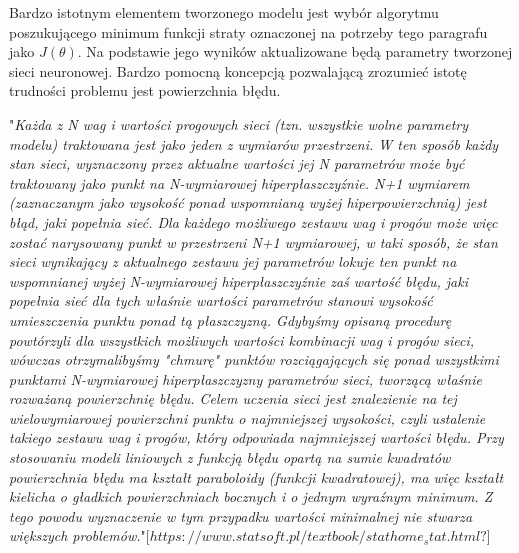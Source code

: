 \documentclass[]{article}
\theoremstyle{definition}
\begin{document}

Bardzo istotnym elementem tworzonego modelu jest wybór algorytmu poszukującego minimum funkcji straty oznaczonej na potrzeby tego paragrafu jako $J(\theta)$. Na podstawie jego wyników aktualizowane będą parametry tworzonej sieci neuronowej. Bardzo pomocną koncepcją pozwalającą zrozumieć istotę trudności problemu jest powierzchnia błędu.

"\textit{Każda z N wag i wartości progowych sieci (tzn. wszystkie wolne parametry modelu) traktowana jest jako jeden z wymiarów przestrzeni. W ten sposób każdy stan sieci, wyznaczony przez aktualne wartości jej N parametrów może być traktowany jako punkt na N-wymiarowej hiperpłaszczyźnie. N+1 wymiarem (zaznaczanym jako wysokość ponad wspomnianą wyżej hiperpowierzchnią) jest błąd, jaki popełnia sieć. Dla każdego możliwego zestawu wag i progów może więc zostać narysowany punkt w przestrzeni N+1 wymiarowej, w taki sposób, że stan sieci wynikający z aktualnego zestawu jej parametrów lokuje ten punkt na wspomnianej wyżej N-wymiarowej hiperpłaszczyźnie zaś wartość błędu, jaki popełnia sieć dla tych właśnie wartości parametrów stanowi wysokość umieszczenia punktu ponad tą płaszczyzną. Gdybyśmy opisaną procedurę powtórzyli dla wszystkich możliwych wartości kombinacji wag i progów sieci, wówczas otrzymalibyśmy "chmurę" punktów rozciągających się ponad wszystkimi punktami N-wymiarowej hiperpłaszczyzny parametrów sieci, tworzącą właśnie rozważaną powierzchnię błędu. Celem uczenia sieci jest znalezienie na tej wielowymiarowej powierzchni punktu o najmniejszej wysokości, czyli ustalenie takiego zestawu wag i progów, który odpowiada najmniejszej wartości błędu.
Przy stosowaniu modeli liniowych z funkcją błędu opartą na sumie kwadratów powierzchnia błędu ma kształt paraboloidy (funkcji kwadratowej), ma więc kształt kielicha o gładkich powierzchniach bocznych i o jednym wyraźnym minimum. Z tego powodu wyznaczenie w tym przypadku wartości minimalnej nie stwarza większych problemów.}"[$https://www.statsoft.pl/textbook/stathome_stat.html?$]
\end{document}

